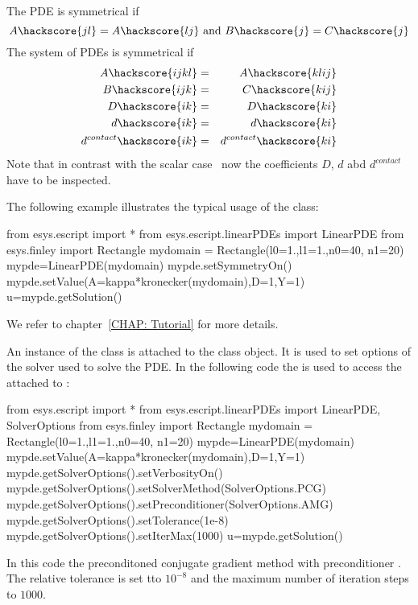 The PDE is symmetrical  if
\begin{equation}\label{LINEARPDE.SINGLE.4}
A\hackscore{jl}=A\hackscore{lj} \mbox{ and } B\hackscore{j}=C\hackscore{j}
\end{equation}
The system of PDEs is symmetrical  if
\begin{eqnarray}
\label{LINEARPDE.SYSTEM.4}
A\hackscore{ijkl}&=&A\hackscore{klij} \\
B\hackscore{ijk}&=&C\hackscore{kij} \\
D\hackscore{ik}&=&D\hackscore{ki} \\
d\hackscore{ik}&=&d\hackscore{ki} \\
d^{contact}\hackscore{ik}&=&d^{contact}\hackscore{ki}
\end{eqnarray}
Note that in contrast with the scalar case~ now the coefficients $D$, $d$ abd $d^{contact}$
have to be inspected.

The following example illustrates the typical usage of the \LinearPDE class:
\begin{python}
from esys.escript import *
from esys.escript.linearPDEs import LinearPDE
from esys.finley import Rectangle
mydomain = Rectangle(l0=1.,l1=1.,n0=40, n1=20)
mypde=LinearPDE(mydomain)
mypde.setSymmetryOn()
mypde.setValue(A=kappa*kronecker(mydomain),D=1,Y=1)
u=mypde.getSolution()
\end{python}
We refer to chapter~\ref{CHAP: Tutorial} for more details.

An instance of the \SolverOptions class is attached to the \LinearPDE class object. It is used to set options of the solver used to solve the PDE. In the following
code the  is used to access the  \SolverOptions 
attached to :
\begin{python}
from esys.escript import *
from esys.escript.linearPDEs import LinearPDE, SolverOptions
from esys.finley import Rectangle
mydomain = Rectangle(l0=1.,l1=1.,n0=40, n1=20)
mypde=LinearPDE(mydomain)
mypde.setValue(A=kappa*kronecker(mydomain),D=1,Y=1)
mypde.getSolverOptions().setVerbosityOn()
mypde.getSolverOptions().setSolverMethod(SolverOptions.PCG)
mypde.getSolverOptions().setPreconditioner(SolverOptions.AMG)
mypde.getSolverOptions().setTolerance(1e-8)
mypde.getSolverOptions().setIterMax(1000)
u=mypde.getSolution()
\end{python}
In this code the preconditoned conjugate gradient method \PCG
with preconditioner \AMG. The relative tolerance is set tto $10^{-8}$ and
the maximum number of iteration steps to $1000$.


